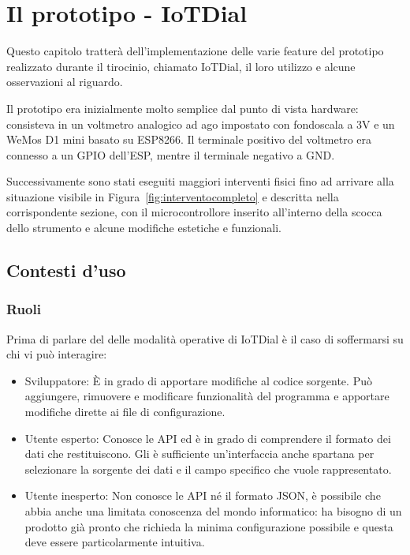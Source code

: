 \documentclass[12pt,a4paper]{report}
\begin{document}
\chapter{Il prototipo - IoTDial}
Questo capitolo tratterà dell'implementazione delle varie feature del prototipo realizzato durante il tirocinio, chiamato IoTDial,
il loro utilizzo e alcune osservazioni al riguardo.

Il prototipo era inizialmente molto semplice dal punto di vista hardware: consisteva in un voltmetro analogico ad ago impostato con
fondoscala a 3V e un WeMos D1 mini basato su ESP8266. Il terminale positivo del voltmetro era connesso a un GPIO dell'ESP,
mentre il terminale negativo a GND.

Successivamente sono stati eseguiti maggiori interventi fisici fino ad arrivare alla situazione visibile in Figura~\ref{fig:interventocompleto}
e descritta nella corrispondente sezione, con il microcontrollore inserito all'interno della scocca dello strumento e alcune modifiche estetiche
e funzionali.

\section{Contesti d'uso}
\subsection{Ruoli}
Prima di parlare del delle modalità operative di IoTDial è il caso di soffermarsi su chi vi può interagire:

\begin{itemize}
  \item Sviluppatore:
È in grado di apportare modifiche al codice sorgente. Può aggiungere, rimuovere e  modificare funzionalità del programma
e apportare modifiche dirette ai file di configurazione.
  \item Utente esperto:
Conosce le API ed è in grado di comprendere il formato dei dati che restituiscono. Gli è sufficiente un'interfaccia anche spartana
per selezionare la sorgente dei dati e il campo specifico che vuole rappresentato.
  \item Utente inesperto:
Non conosce le API né il formato JSON, è possibile che abbia anche una limitata conoscenza del mondo informatico:
ha bisogno di un prodotto già pronto che richieda la minima configurazione possibile e questa
deve essere particolarmente intuitiva. 
\end{itemize}
\end{document}
